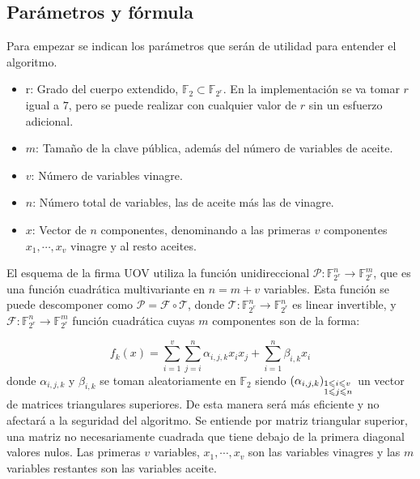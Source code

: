 \subsection{Parámetros y fórmula}
Para empezar se indican los parámetros que serán de utilidad para entender el algoritmo.
\begin{itemize}
	\item r: Grado del cuerpo extendido, $\mathds{F}_2 \subset \mathds{F}_{2^r}$. En la implementación se va tomar $r$ igual a $7$, pero se puede realizar con cualquier valor de $r$ sin un esfuerzo adicional.
	\item $m$: Tamaño de la clave pública, además del número de variables de aceite.
	\item $v$: Número de variables vinagre.
	\item $n$: Número total de variables, las de aceite más las de vinagre.
	\item $x$: Vector de $n$ componentes, denominando a las primeras $v$ componentes  $x_1, \dotsb, x_v$ vinagre y al resto aceites.
	
	
\end{itemize}

El esquema de la firma UOV utiliza la función unidireccional $\mathcal{P}: \mathds{F}_{2^r}^n \rightarrow \mathds{F}_{2^r}^m$, que es una función cuadrática multivariante en $n = m + v$ variables. Esta función se puede descomponer como $\mathcal{P} = \mathcal{F} \circ \mathcal{T}$, donde $\mathcal{T}: \mathds{F}_{2^r}^n \rightarrow \mathds{F}_{2^r}^n$ es linear invertible, y $\mathcal{F}: \mathds{F}_{2^r}^n \rightarrow \mathds{F}_{2^r}^m$  función cuadrática cuyas $m$ componentes son de la forma:

\begin{equation}\label{eq:fun}
f_k(x) = \sum_{i=1}^v \sum_{j=i}^n \alpha_{i,j,k} x_i x_j + \sum_{i=1}^n \beta_{i,k} x_i
\end{equation}
donde $\alpha_{i,j,k}$ y $\beta_{i,k}$ se toman aleatoriamente en $\mathds{F}_2$ siendo $\left(\alpha_{i,j,k}\right)_{\begin{subarray}{l}{1\leqslant i \leqslant v }\\ {1 \leqslant j \leqslant n}\end{subarray}}$ un vector de matrices triangulares superiores. De esta manera será más eficiente y no afectará a la seguridad del algoritmo. Se entiende por matriz triangular superior, una matriz no necesariamente cuadrada que tiene debajo de la primera diagonal valores nulos. Las primeras $v$ variables, $x_1,\cdots,x_v$ son las variables vinagres y las $m$ variables restantes son las variables aceite.



